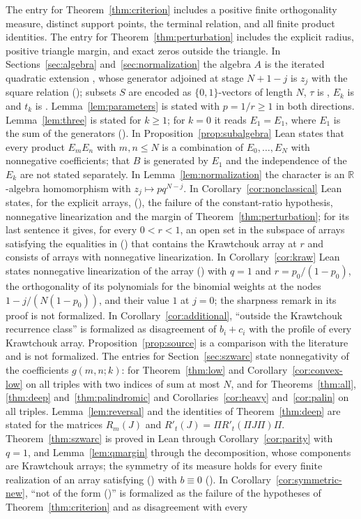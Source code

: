\documentclass[twoside,10pt]{article}
\numberwithin{equation}{section}
\theoremstyle{slbody}
\theoremstyle{definition}
\theoremstyle{remark}
\renewcommand{\eqref}[1]{\textup{{\normalfont(\oldstylenums{\ref{#1}}}\normalfont)}}
\begin{document}
The entry for Theorem~\ref{thm:criterion} includes a positive finite orthogonality measure, distinct support points, the terminal relation, and all finite product identities. The entry for Theorem~\ref{thm:perturbation} includes the explicit radius, positive triangle margin, and exact zeros outside the triangle. In Sections~\ref{sec:algebra} and~\ref{sec:normalization} the algebra $A$ is the iterated quadratic extension , whose generator adjoined at stage $N+1-j$ is $z_j$ with the square relation \eqref{eq:algebra}; subsets $S$ are encoded as $\{0,1\}$-vectors of length $N$, $\tau$ is , $E_k$ is  and $t_k$ is . Lemma~\ref{lem:parameters} is stated with $p=1/r\geq1$ in both directions. Lemma~\ref{lem:three} is stated for $k\geq1$; for $k=0$ it reads $E_1=E_1$, where $E_1$ is the sum of the generators (). In Proposition~\ref{prop:subalgebra} Lean states that every product $E_mE_n$ with $m,n\leq N$ is a combination of $E_0,\ldots,E_N$ with nonnegative coefficients; that $B$ is generated by $E_1$ and the independence of the $E_k$ are not stated separately. In Lemma~\ref{lem:normalization} the character is an $\mathbb R$-algebra homomorphism with $z_j\mapsto pq^{N-j}$. In Corollary~\ref{cor:nonclassical} Lean states, for the explicit arrays, \eqref{eq:basic}, the failure of the constant-ratio hypothesis, nonnegative linearization and the margin of Theorem~\ref{thm:perturbation}; for its last sentence it gives, for every $0<r<1$, an open set in the subspace of arrays satisfying the equalities in \eqref{eq:basic} that contains the Krawtchouk array at $r$ and consists of arrays with nonnegative linearization. In Corollary~\ref{cor:kraw} Lean states nonnegative linearization of the array \eqref{eq:parameters} with $q=1$ and $r=p_0/(1-p_0)$, the orthogonality of its polynomials for the binomial weights at the nodes $1-j/(N(1-p_0))$, and their value $1$ at $j=0$; the sharpness remark in its proof is not formalized. In Corollary~\ref{cor:additional}, ``outside the Krawtchouk recurrence class'' is formalized as disagreement of $b_i+c_i$ with the profile of every Krawtchouk array. Proposition~\ref{prop:source} is a comparison with the literature and is not formalized. The entries for Section~\ref{sec:szwarc} state nonnegativity of the coefficients $g(m,n;k)$: for Theorem~\ref{thm:low} and Corollary~\ref{cor:convex-low} on all triples with two indices of sum at most $N$, and for Theorems~\ref{thm:all}, \ref{thm:deep} and~\ref{thm:palindromic} and Corollaries~\ref{cor:heavy} and~\ref{cor:palin} on all triples. Lemma~\ref{lem:reversal} and the identities of Theorem~\ref{thm:deep} are stated for the matrices $R_m(J)$ and $R'_t(J)=\Pi R'_t(\Pi J\Pi)\Pi$. Theorem~\ref{thm:szwarc} is proved in Lean through Corollary~\ref{cor:parity} with $q=1$, and Lemma~\ref{lem:qmargin} through the decomposition, whose components are Krawtchouk arrays; the symmetry of its measure holds for every finite realization of an array satisfying \eqref{eq:basic} with $b\equiv0$ (). In Corollary~\ref{cor:symmetric-new}, ``not of the form \eqref{eq:parameters}'' is formalized as the failure of the hypotheses of Theorem~\ref{thm:criterion} and as disagreement with every 
\end{document}
